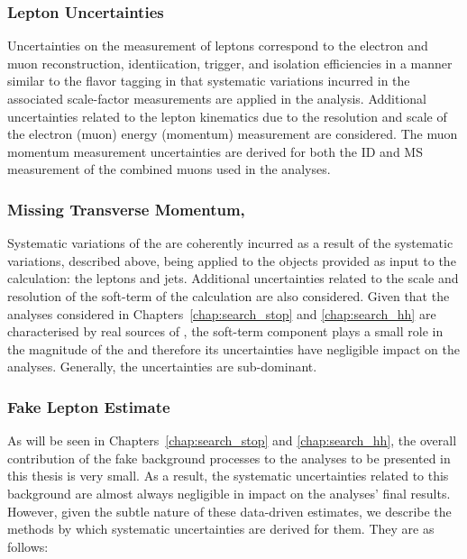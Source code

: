 \subsubsection{Lepton Uncertainties}
Uncertainties on the measurement of leptons correspond to the electron and muon reconstruction,
identiication, trigger, and isolation {\color{red}{don't forget to describe lepton isolation}} efficiencies in a manner similar to the flavor tagging
in that systematic variations incurred in the associated scale-factor measurements are applied
in the analysis.
Additional uncertainties related to the lepton kinematics due to the resolution and scale of the
electron (muon) energy (momentum) measurement are considered.
The muon momentum measurement uncertainties are derived for both the ID and MS measurement
of the combined muons used in the analyses.

\subsubsection{Missing Transverse Momentum, \met}
Systematic variations of the \met are coherently incurred as a result of the
systematic variations, described above, being applied to the objects provided as input to the \met calculation:
the leptons and jets.
Additional uncertainties related to the scale and resolution of the soft-term of the \met calculation
are also considered.
Given that the analyses considered in Chapters~\ref{chap:search_stop} and \ref{chap:search_hh}
are characterised by real sources of \met, the soft-term component plays a small role in the magnitude
of the \met and therefore its uncertainties have negligible impact on the analyses.
Generally, the \met uncertainties are sub-dominant.

\subsubsection{Fake Lepton Estimate}

As will be seen in Chapters~\ref{chap:search_stop} and \ref{chap:search_hh}, the overall contribution
of the fake background processes to the analyses to be presented in this thesis is very small.
As a result, the systematic uncertainties related to this background are almost always negligible
in impact on the analyses' final results.
However, given the subtle nature of these data-driven estimates, we describe the methods by which
systematic uncertainties are derived for them.
They are as follows:

